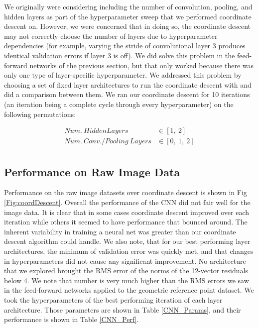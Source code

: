 \documentclass[journal]{IEEEtran}
\begin{document}
We originally were considering including the number of convolution, pooling, and hidden layers as part of the hyperparameter sweep that we performed coordinate descent on. However, we were concerned that in doing so, the coordinate descent may not correctly choose the number of layers due to hyperparameter dependencies (for example, varying the stride of convolutional layer 3 produces identical validation errors if layer 3 is off). We did solve this problem in the feed-forward networks of the previous section, but that only worked because there was only one type of layer-specific hyperparameter. We addressed this problem by choosing a set of fixed layer architectures to run the coordinate descent with and did a comparison between them. We ran our coordinate descent for 10 iterations (an iteration being a complete cycle through every hyperparameter) on the following permutations:

\begin{align*}
Num.\ Hidden Layers\  &\in [1,\ 2]\\
Num.\ Conv./Pooling\ Layers &\in [0,\ 1,\ 2]\\
\end{align*}


\subsection{Performance on Raw Image Data}



Performance on the raw image datasets over coordinate descent is shown in Fig \ref{Fig:coordDescent}. Overall the performance of the CNN did not fair well for the image data. It is clear that in some cases coordinate descent improved over each iteration while others it seemed to have performance that bounced around. The inherent variability in training a neural net was greater than our coordinate descent algorithm could handle. We also note, that for our best performing layer architectures, the minimum of validation error was quickly met, and that changes in hyperparameters did not cause any significant improvement. No architecture that we explored brought the RMS error of the norms of the 12-vector residuals below 4. We note that number is very much higher than the RMS errors we saw in the feed-forward networks applied to the geometric reference point dataset. We took the hyperparameters of the best performing iteration of each layer architecture. Those parameters are shown in Table \ref{CNN_Params}, and their performance is shown in Table \ref{CNN_Perf}.
\end{document}
